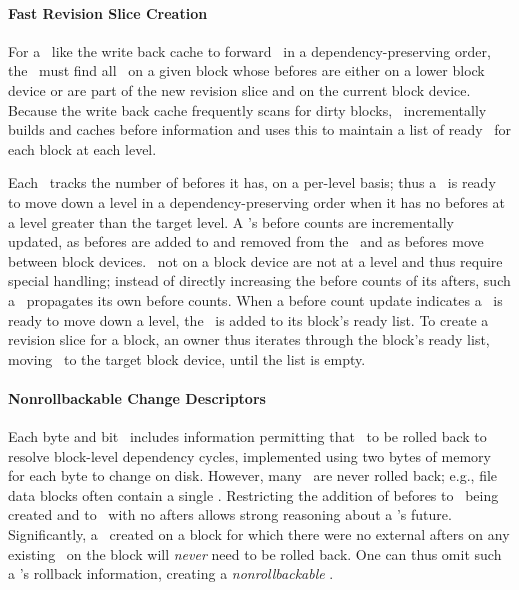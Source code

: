 \paragraph{Fast Revision Slice Creation}
%
For a \module\ like the write back cache to forward \chdescs\ in a
dependency-preserving order, the \module\ must find all \chdescs\ on a
given block whose befores are either on a lower block device or are
part of the new revision slice and on the current block device.
Because the write back cache frequently scans for dirty blocks,
\Kudos\ incrementally builds and caches before information and uses
this to maintain a list of ready \chdescs\ for each block at each
level.

Each \chdesc\ tracks the number of befores it has, on a per-level basis;
%
thus a \chdesc\ is ready to move down a level in a dependency-preserving
order when it has no befores at a level greater than the target level.
%
A \chdesc{}'s before counts are incrementally updated, as befores are
added to and removed from the \chdesc\ and as befores move between
block devices. \Noops\ not on a block device are not at a level and thus
require special handling; instead of directly increasing the before
counts of its afters, such a \noop\ propagates its own before counts.
%
When a before count update indicates a \chdesc\ is ready to move down
a level, the \chdesc\ is added to its block's ready list. To create a
revision slice for a block, an owner thus iterates through the block's
ready list, moving \chdescs\ to the target block device, until the
list is empty.

\paragraph{Nonrollbackable Change Descriptors}
%
Each byte and bit \chdesc\ includes information permitting that
\chdesc\ to be rolled back to resolve block-level dependency cycles,
implemented using two bytes of memory for each byte to change on disk.
%
However, many \chdescs\ are never rolled back; e.g., file data blocks
often contain a single \chdesc. Restricting the addition of befores to
\chdescs\ being created and to \noops\ with no afters allows strong reasoning about a \chdesc{}'s
future.  Significantly, a \chdesc\ created on a block for which there
were no external afters on any existing \chdesc\ on the block will
\textit{never} need to be rolled back. One can thus omit such a
\chdesc{}'s rollback information, creating a \textit{nonrollbackable}
\chdesc.

